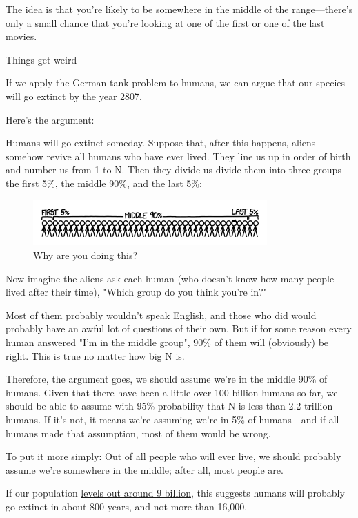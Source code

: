 {{The idea is that you're likely to be somewhere in the middle of the range—there's only a small chance that you're looking at one of the first or one of the last movies.}

{Things get weird}

{If we apply the German tank problem to humans, we can argue that our species will go extinct by the year 2807.}

{Here's the argument:}

{Humans will go extinct someday. Suppose that, after this happens, aliens somehow revive all humans who have ever lived. They line us up in order of birth and number us from 1 to N. Then they divide us divide them into three groups—the first 5\%, the middle 90\%, and the last 5\%:}

\begin{figure}[!htbp]
\centering
\includegraphics[scale=0.5, max width=0.8\textwidth]{imgs/a/65/timeline_groups.png}
\caption{Why are you doing this?}
\end{figure}

{Now imagine the aliens ask each human (who doesn't know how many people lived after their time), "Which group do you think you're in?"}

{Most of them probably wouldn't speak English, and those who did would probably have an awful lot of questions of their own. But if for some reason every human answered "I'm in the middle group", 90\% of them will (obviously) be right. This is true no matter how big N is.}

{Therefore, the argument goes, we should assume we're in the middle 90\% of humans. Given that there have been a little over 100 billion humans so far, we should be able to assume with 95\% probability that N is less than 2.2 trillion humans. If it's not, it means we're assuming we're in 5\% of humans—and if all humans made that assumption, most of them would be wrong.}

{To put it more simply: Out of all people who will ever live, we should probably assume we're somewhere in the middle; after all, most people are.}

{If our population \href{http://www.un.org/esa/population/publications/longrange2/WorldPop2300final.pdf}{levels out around 9 billion}, this suggests humans will probably go extinct in about 800 years, and not more than 16,000.}

}
